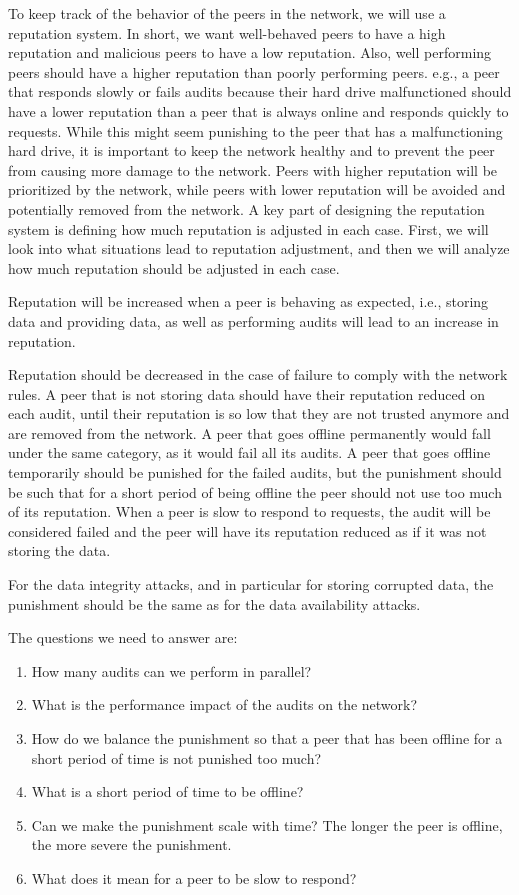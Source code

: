 To keep track of the behavior of the peers in the network, we will use a reputation system.
In short, we want well-behaved peers to have a high reputation and malicious peers to have a low reputation.
Also, well performing peers should have a higher reputation than poorly performing peers.
e.g., a peer that responds slowly or fails audits because their hard drive malfunctioned should
have a lower reputation than a peer that is always online and responds quickly to requests.
While this might seem punishing to the peer that has a malfunctioning hard drive,
it is important to keep the network healthy and to prevent the peer from causing more damage to the network.
Peers with higher reputation will be prioritized by the network, while peers with lower reputation will be
avoided and potentially removed from the network.
A key part of designing the reputation system is defining how much reputation is adjusted in each case.
First, we will look into what situations lead to reputation adjustment, and then we will
analyze how much reputation should be adjusted in each case.

Reputation will be increased when a peer is behaving as expected,
i.e., storing data and providing data, as well as performing audits will lead to an increase in reputation.

Reputation should be decreased in the case of failure to comply with the network rules.
A peer that is not storing data should have their reputation reduced on each audit,
until their reputation is so low that they are not trusted anymore and are removed from the network.
A peer that goes offline permanently would fall under the same category, as it would fail all its audits.
A peer that goes offline temporarily should be punished for the failed audits,
but the punishment should be such that for a short period of being offline the peer should not use 
too much of its reputation.
When a peer is slow to respond to requests, the audit will be considered failed and the peer will have
its reputation reduced as if it was not storing the data.

For the data integrity attacks, and in particular for storing corrupted data,
the punishment should be the same as for the data availability attacks.

The questions we need to answer are:
\begin{enumerate}
    \item How many audits can we perform in parallel?
    \item What is the performance impact of the audits on the network?
    \item How do we balance the punishment so that a peer that has been offline for a short period of time
        is not punished too much?
    \item What is a short period of time to be offline?
    \item Can we make the punishment scale with time? The longer the peer is offline, the more severe the punishment.
    \item What does it mean for a peer to be slow to respond?
\end{enumerate}

